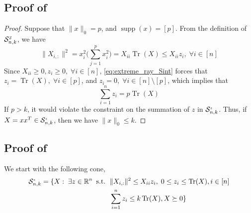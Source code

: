 \documentclass[11pt]{amsart}
\newcommand{\Sz}[2]{\ensuremath{\mathcal{S}_{#1,#2}^{\textit{\tiny{Z}}}}}
\newcommand{\Sint}[2]{\ensuremath{\mathcal{S}_{#1,#2}^{\textit{\tiny{z}}}}}
\theoremstyle{plain}
\theoremstyle{definition}
\theoremstyle{remark}
\newcommand{\RR}{\mathbb{R}}
\newcommand{\st}{\text{\, s.t.\, }}
\DeclareMathOperator{\tr}{Tr}
\DeclareMathOperator{\supp}{supp}
\begin{document}
\begin{appendices}
		\subsection{Proof of }\label{append:lem_Sz_rank_one}
		\begin{proof}
			Suppose that \(\|x\|_0=p\), and \(\supp(x)=[p]\). From the definition of \Sz{n}{k}, we have
			\begin{equation}\label{eq:extreme_ray_Sint}
				\|X_{i,:}\|^2 = x_i^2 \big(\sum_{j=1}^p x_i^2\big) = X_{ii} \tr(X) \leq X_{ii}z_i,\;\forall i\in [n]
			\end{equation}
			Since \(X_{ii}\geq 0, z_i\geq 0,\;\forall i\in [n]\), \eqref{eq:extreme_ray_Sint} forces that \(z_i = \tr(X),\;\forall i\in [p]\), and \(z_i = 0,\;\forall i\in [n]\setminus[p]\), which implies that 
			\[
			\sum_{i=1}^nz_i = p\tr(X)
			\]
			If \(p>k\), it would violate the constraint on the summation of \(z\) in \Sint{n}{k}. Thus, if \(X = xx^T\in \Sint{n}{k}\), then we have \(\|x\|_0 \leq k\). 
		\end{proof}
		
		\subsection{Proof of }\label{append:thm_Sz_perturbation}
		We start with the following cone, 
		\small{\begin{equation}
				\begin{split}
					\Sint{n}{k} = \{X: \;\exists z \in \RR^n \st
					&\|X_{i,:}\|^2\leq X_{ii}z_i,\;0\leq z_i\leq \tr(X), i\in[n]\\
					&\sum_{i=1}^n z_i \leq k \tr(X),X\succeq 0\}
				\end{split}
		\end{equation}}
        

\end{appendices}
\end{document}
